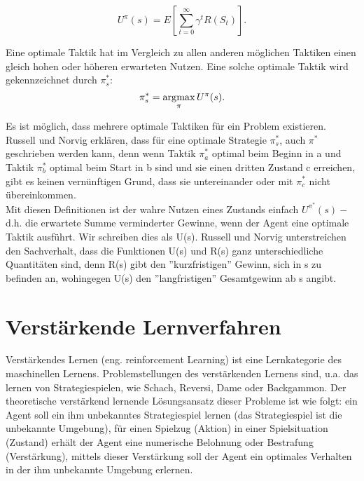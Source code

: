 \begin{equation}
\label{eq:Der erwartete Nutzen}
U^\pi(s) = E\left[\sum_{t=0}^{\infty} \gamma^t R(S_t)\right].
\end{equation}

Eine optimale Taktik hat im Vergleich zu allen anderen möglichen Taktiken einen gleich hohen oder höheren erwarteten Nutzen. Eine solche optimale Taktik wird gekennzeichnet durch $\pi^*_s$: \\ 

\begin{equation}
\pi^*_s = \operatorname*{arg\!\max}_\pi U^\pi(s).
\end{equation}

Es ist möglich, dass mehrere optimale Taktiken für ein Problem existieren. Russell und Norvig erklären, dass für eine optimale Strategie $\pi^*_s$, auch $\pi^*$ geschrieben werden kann, denn wenn Taktik $\pi^*_a$ optimal beim Beginn in a und Taktik $\pi^*_b$ optimal beim Start in b sind und sie einen dritten Zustand c erreichen, gibt es keinen vernünftigen Grund, dass sie untereinander oder mit $\pi^*_c$ nicht übereinkommen. \\

Mit diesen Definitionen ist der wahre Nutzen eines Zustands einfach $U^{\pi^*}(s) -$ d.h. die erwartete Summe verminderter Gewinne, wenn der Agent eine optimale Taktik ausführt. Wir schreiben dies als U(s). Russell und Norvig unterstreichen den Sachverhalt, dass die Funktionen U(s) und R(s) ganz unterschiedliche Quantitäten sind, denn R(s) gibt den ''kurzfristigen'' Gewinn, sich in s zu befinden an, wohingegen U(s) den ''langfristigen'' Gesamtgewinn ab s angibt.

\section{Verstärkende Lernverfahren}
Verstärkendes Lernen (eng. reinforcement Learning) ist eine Lernkategorie des maschinellen Lernens. Problemstellungen des verstärkenden Lernens sind, u.a. das lernen von Strategiespielen, wie Schach, Reversi, Dame oder Backgammon. Der theoretische verstärkend lernende Lösungsansatz dieser Probleme ist wie folgt: ein Agent soll ein ihm unbekanntes Strategiespiel lernen (das Strategiespiel ist die unbekannte Umgebung), für einen Spielzug  (Aktion) in einer Spielsituation (Zustand) erhält der Agent eine numerische Belohnung oder Bestrafung (Verstärkung), mittels dieser Verstärkung soll der Agent ein optimales Verhalten in der ihm unbekannte Umgebung erlernen. \\

